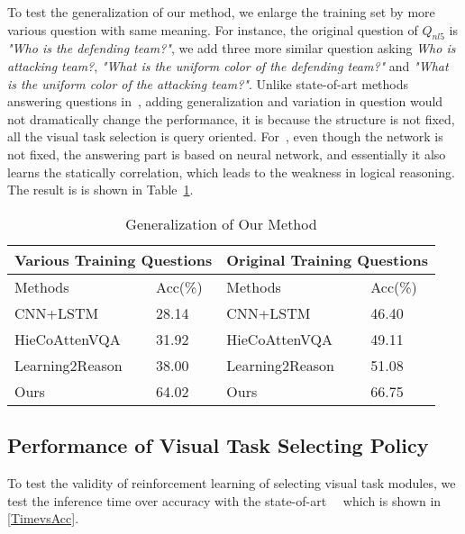 To test the generalization of our method, we enlarge the training set by more various question with same meaning. For instance, the original question of $Q_{nl5}$ is \textit{"Who is the defending team?"}, we add three more similar question asking \textit{Who is attacking team?}, \textit{"What is the uniform color of the defending team?"} and \textit{"What is the uniform color of the attacking team?"}. Unlike state-of-art methods answering questions in~\cite{peixi2019}, adding generalization and variation in question would not dramatically change the performance, it is because the structure is not fixed, all the visual task selection is query oriented. For~\cite{hu2017learning}, even though the network is not fixed, the answering part is based on neural network, and essentially it also learns the statically correlation, which leads to the weakness in logical reasoning. The result is is shown in Table~\ref{table:genralization}.

\begin{table}[h]
	\small
	\begin{tabular}{|l|l|l|l|}
		\hline
		\multicolumn{2}{|l|}{Various Training Questions} & \multicolumn{2}{l|}{Original Training Questions} \\ \hline
		Methods                  & Acc(\%)            & Methods                   & Acc(\%)             \\ \hline
		CNN+LSTM                    & 28.14              & CNN+LSTM                     & 46.40               \\ \hline
		HieCoAttenVQA               & 31.92              & HieCoAttenVQA                & 49.11               \\ \hline
		Learning2Reason             & 38.00              & Learning2Reason              & 51.08               \\ \hline
		Ours                        & 64.02              & Ours                         & 66.75               \\ \hline
	\end{tabular}
	\caption{Generalization of Our Method} \label{table:genralization}
\end{table}


\subsection{Performance of Visual Task Selecting Policy }

To test the validity of reinforcement learning of selecting visual task modules, we test the inference time over accuracy with the state-of-art~\cite{VQA}~\cite{Lu2016Hie} which is shown in \autoref{TimevsAcc}.

